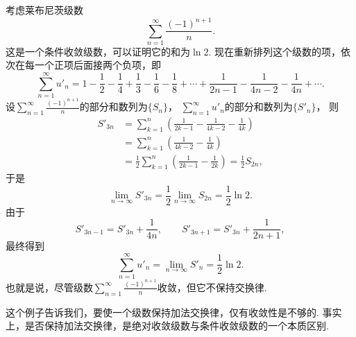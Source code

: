 考虑莱布尼茨级数\[
	\sum_{n=1}^\infty \frac{(-1)^{n+1}}n.
\]
这是一个条件收敛级数，可以证明它的和为\(\ln2\).
现在重新排列这个级数的项，依次在每一个正项后面接两个负项，即\[
	\sum_{n=1}^\infty u'_n
	= 1 - \frac12 - \frac14
	+ \frac13 - \frac16 - \frac18
	+ \dotsb
	+ \frac1{2n-1} - \frac1{4n-2} - \frac1{4n}
	+ \dotsb.
\]
设\(\sum_{n=1}^\infty \frac{(-1)^{n+1}}n\)的部分和数列为\(\{S_n\}\)，
\(\sum_{n=1}^\infty u'_n\)的部分和数列为\(\{S'_n\}\)，
则\begin{align*}
	S'_{3n}
	&= \sum_{k=1}^n \left(
		\frac1{2k-1} - \frac1{4k-2} - \frac1{4k}
	\right) \\
	&= \sum_{k=1}^n \left(
		\frac1{4k-2} - \frac1{4k}
	\right) \\
	&= \frac12 \sum_{k=1}^n \left(
		\frac1{2k-1} - \frac1{2k}
	\right)
	= \frac12 S_{2n},
\end{align*}
于是\[
	\lim_{n\to\infty} S'_{3n}
	= \frac12 \lim_{n\to\infty} S_{2n}
	= \frac12 \ln 2.
\]
由于\[
	S'_{3n-1} = S'_{3n} + \frac1{4n},
	\qquad
	S'_{3n+1} = S'_{3n} + \frac1{2n+1},
\]
最终得到\[
	\sum_{n=1}^\infty u'_n
	= \lim_{n\to\infty} S'_n
	= \frac12 \ln 2.
\]
也就是说，尽管级数\(\sum_{n=1}^\infty \frac{(-1)^{n+1}}n\)收敛，但它不保持交换律.

这个例子告诉我们，要使一个级数保持加法交换律，仅有收敛性是不够的.
事实上，是否保持加法交换律，是绝对收敛级数与条件收敛级数的一个本质区别.

